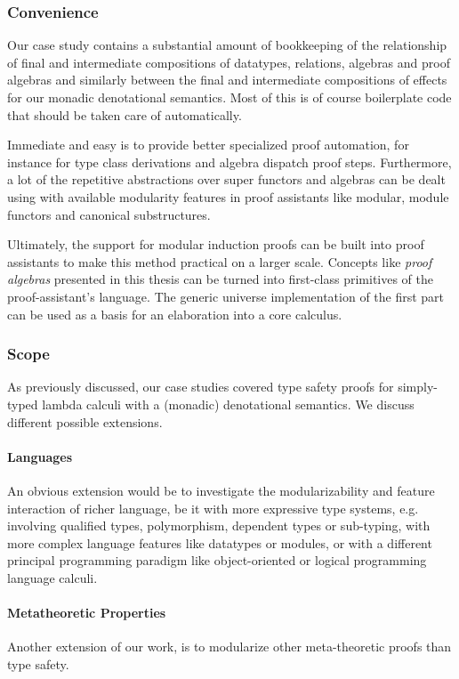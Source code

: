 \subsubsection{Convenience}

Our case study contains a substantial amount of bookkeeping of the relationship
of final and intermediate compositions of datatypes, relations, algebras and
proof algebras and similarly between the final and intermediate compositions of
effects for our monadic denotational semantics. Most of this is of course
boilerplate code that should be taken care of automatically.

Immediate and easy is to provide better specialized proof automation, for
instance for type class derivations and algebra dispatch proof steps.
Furthermore, a lot of the repetitive abstractions over super functors and
algebras can be dealt using with available modularity features in proof
assistants like modular, module functors and canonical substructures.

Ultimately, the support for modular induction proofs can be built into proof
assistants to make this method practical on a larger scale. Concepts like
\emph{proof algebras} presented in this thesis can be turned into first-class
primitives of the proof-assistant's language. The generic universe
implementation of the first part can be used as a basis for an elaboration into
a core calculus.


\subsubsection{Scope}

As previously discussed, our case studies covered type safety proofs for
simply-typed lambda calculi with a (monadic) denotational semantics. We discuss
different possible extensions.

\paragraph{Languages}
An obvious extension would be to investigate the modularizability and feature
interaction of richer language, be it with more expressive type systems, e.g.
involving qualified types, polymorphism, dependent types or sub-typing, with
more complex language features like datatypes or modules, or with a different
principal programming paradigm like object-oriented or logical programming
language calculi.

\paragraph{Metatheoretic Properties}
Another extension of our work, is to modularize other meta-theoretic proofs than
type safety.

